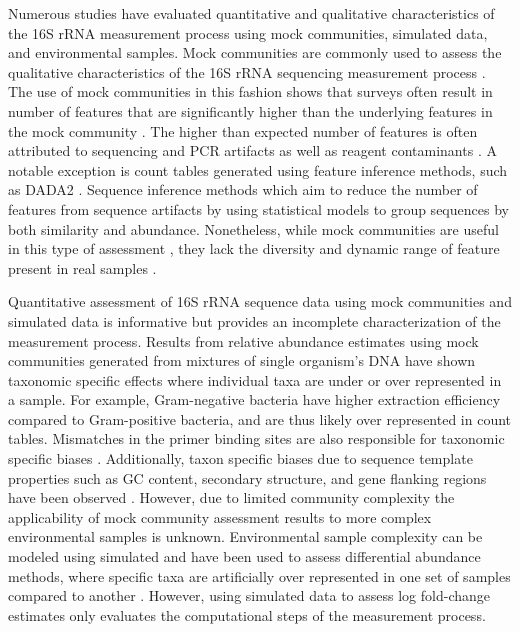 \documentclass[linenumbers]{bmcart}
\begin{document}
Numerous studies have evaluated quantitative and qualitative
characteristics of the 16S rRNA measurement process using mock
communities, simulated data, and environmental samples.
Mock communities are commonly used to assess the qualitative
characteristics of the 16S rRNA sequencing measurement process
\cite{bokulich2016mockrobiota}. The use of mock communities
in this fashion shows that surveys often result in number of features that are significantly higher 
than the underlying features in the mock community
\cite{Kopylova2014}. The higher than expected number of features is
often attributed to sequencing and PCR artifacts as well as reagent
contaminants \cite{brooks2015truth, Huse2010}. 
A notable exception is count tables generated using feature inference methods, such as DADA2 \cite{callahan2016dada2}. Sequence inference methods which aim to reduce the number of features from sequence artifacts by using statistical models to group sequences by both similarity and abundance.
Nonetheless, while mock communities are useful in this type of assessment , they lack the diversity and dynamic range of feature present in real samples \cite{bokulich2016mockrobiota}.

Quantitative assessment of 16S rRNA sequence data using mock communities and
simulated data is informative but provides an
incomplete characterization of the measurement process.
Results from relative abundance estimates using mock communities generated from
mixtures of single organism's DNA have shown taxonomic specific effects
where individual taxa are under or over represented in a sample. For
example, Gram-negative bacteria have higher extraction efficiency
compared to Gram-positive bacteria, and are thus likely over represented
in count tables\cite{Costea2017, Olson2012}.
Mismatches in the primer binding sites are also responsible for
taxonomic specific biases
\cite{brooks2015truth, klindworth2012evaluation, Gohl2016}.
Additionally, taxon specific biases due to sequence template properties
such as GC content, secondary structure, and gene flanking regions have
been observed \cite{Pinto2012, Hansen1998, Gohl2016}.
However, due to limited community complexity the applicability of
mock community assessment results to more complex environmental samples is unknown. 
Environmental sample complexity can be modeled using simulated and have been used to assess differential abundance methods, where specific taxa are
artificially over represented in one set of samples compared to another
\cite{McMurdie2014}. 
However, using simulated data to assess log fold-change
estimates only evaluates the computational steps of the measurement process.
\end{document}
